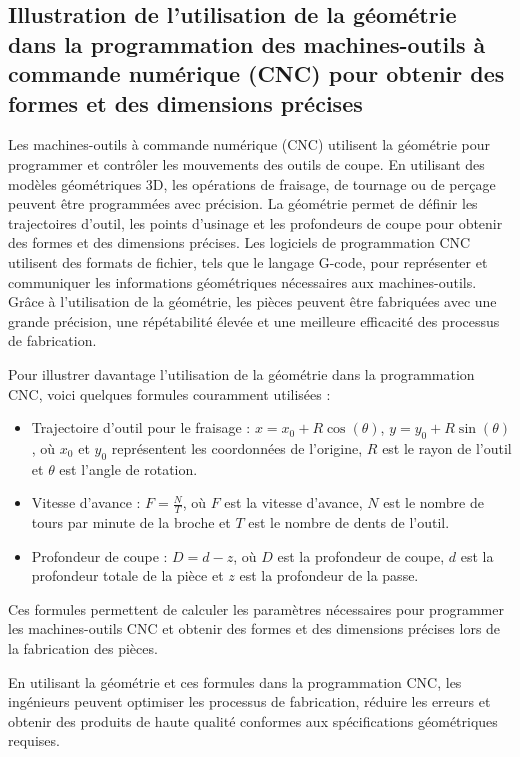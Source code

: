 \documentclass{article}
\begin{document}
\subsection{Illustration de l'utilisation de la géométrie dans la programmation des machines-outils à commande numérique (CNC) pour obtenir des formes et des dimensions précises}

Les machines-outils à commande numérique (CNC) utilisent la géométrie pour programmer et contrôler les mouvements des outils de coupe. En utilisant des modèles géométriques 3D, les opérations de fraisage, de tournage ou de perçage peuvent être programmées avec précision. La géométrie permet de définir les trajectoires d'outil, les points d'usinage et les profondeurs de coupe pour obtenir des formes et des dimensions précises. Les logiciels de programmation CNC utilisent des formats de fichier, tels que le langage G-code, pour représenter et communiquer les informations géométriques nécessaires aux machines-outils. Grâce à l'utilisation de la géométrie, les pièces peuvent être fabriquées avec une grande précision, une répétabilité élevée et une meilleure efficacité des processus de fabrication.

Pour illustrer davantage l'utilisation de la géométrie dans la programmation CNC, voici quelques formules couramment utilisées :

\begin{itemize}
  \item Trajectoire d'outil pour le fraisage : $x = x_0 + R\cos(\theta)$, $y = y_0 + R\sin(\theta)$, où $x_0$ et $y_0$ représentent les coordonnées de l'origine, $R$ est le rayon de l'outil et $\theta$ est l'angle de rotation.

  \item Vitesse d'avance : $F = \frac{N}{T}$, où $F$ est la vitesse d'avance, $N$ est le nombre de tours par minute de la broche et $T$ est le nombre de dents de l'outil.

  \item Profondeur de coupe : $D = d - z$, où $D$ est la profondeur de coupe, $d$ est la profondeur totale de la pièce et $z$ est la profondeur de la passe.

\end{itemize}

Ces formules permettent de calculer les paramètres nécessaires pour programmer les machines-outils CNC et obtenir des formes et des dimensions précises lors de la fabrication des pièces.

En utilisant la géométrie et ces formules dans la programmation CNC, les ingénieurs peuvent optimiser les processus de fabrication, réduire les erreurs et obtenir des produits de haute qualité conformes aux spécifications géométriques requises.
\end{document}
